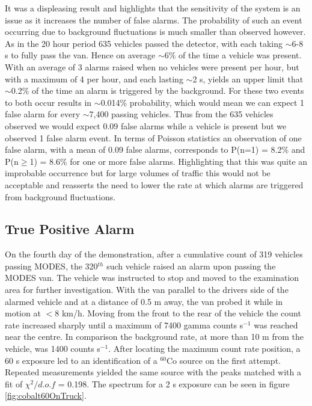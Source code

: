 It was a displeasing result and highlights that the sensitivity of the system is an issue as it increases the number of false alarms. The probability of such an event occurring due to background fluctuations is much smaller than observed however. As in the 20 hour period 635 vehicles passed the detector, with each taking $\sim$6-8 s to fully pass the van. Hence on average $\sim$6\% of the time a vehicle was present. With an average of 3 alarms raised when no vehicles were present per hour, but with a maximum of 4 per hour, and each lasting $\sim$2 s, yields an upper limit that $\sim$0.2\% of the time an alarm is triggered by the background. For these two events to both occur results in $\sim$0.014\% probability, which would mean we can expect 1 false alarm for every $\sim$7,400 passing vehicles. Thus from the 635 vehicles observed we would expect 0.09 false alarms while a vehicle is present but we observed 1 false alarm event. In terms of Poisson statistics an observation of one false alarm, with a mean of 0.09 false alarms, corresponds to P(n=1) = 8.2\% and P(n$\geq$1) = 8.6\% for one or more false alarms. Highlighting that this was quite an improbable occurrence but for large volumes of traffic this would not be acceptable and reasserts the need to lower the rate at which alarms are triggered from background fluctuations.

\subsection{True Positive Alarm}
On the fourth day of the demonstration, after a cumulative count of 319 vehicles passing MODES, the 320$^{th}$ such vehicle raised an alarm upon passing the MODES van. The vehicle was instructed to stop and moved to the examination area for further investigation. With the van parallel to the drivers side of the alarmed vehicle and at a distance of 0.5 m away, the van probed it while in motion at $<$8 km/h. Moving from the front to the rear of the vehicle the count rate increased sharply until a maximum of 7400 gamma counts s$^{-1}$ was reached near the centre. In comparison the background rate, at more than 10 m from the vehicle, was 1400 counts s$^{-1}$. After locating the maximum count rate position, a 60 s exposure led to an identification of a $^{60}$Co source on the first attempt. Repeated measurements yielded the same source with the peaks matched with a fit of $\chi^{2}/d.o.f$ = 0.198. The spectrum for a 2 s exposure can be seen in figure \ref{fig:cobalt60OnTruck}. 

